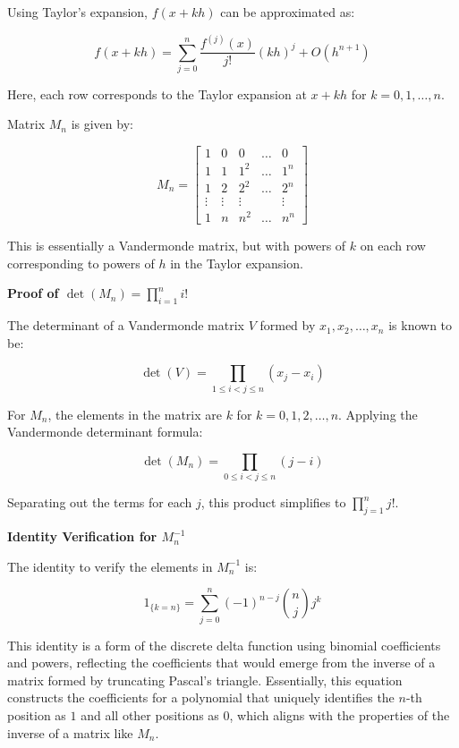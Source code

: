 \documentclass[8pt]{article}
\begin{document}
Using Taylor's expansion, \( f(x + kh) \) can be approximated as:

\[
f(x + kh) = \sum_{j=0}^n \frac{f^{(j)}(x)}{j!} (kh)^j + O(h^{n+1})
\]

Here, each row corresponds to the Taylor expansion at \( x + kh \) for \( k = 0, 1, \ldots, n \).

Matrix \( M_n \) is given by:

\[
M_n = \begin{bmatrix}
1 & 0 & 0 & \dots & 0 \\
1 & 1 & 1^2 & \dots & 1^n \\
1 & 2 & 2^2 & \dots & 2^n \\
\vdots & \vdots & \vdots & & \vdots \\
1 & n & n^2 & \dots & n^n
\end{bmatrix}
\]

This is essentially a Vandermonde matrix, but with powers of \( k \) on each row corresponding to powers of \( h \) in the Taylor expansion.

\textbf{Proof of \( \det(M_n) = \prod_{i=1}^n i! \)}

The determinant of a Vandermonde matrix \( V \) formed by \( x_1, x_2, \ldots, x_n \) is known to be:

\[
\det(V) = \prod_{1 \leq i < j \leq n} (x_j - x_i)
\]

For \( M_n \), the elements in the matrix are \( k \) for \( k = 0, 1, 2, \ldots, n \). Applying the Vandermonde determinant formula:

\[
\det(M_n) = \prod_{0 \leq i < j \leq n} (j - i)
\]

Separating out the terms for each \( j \), this product simplifies to \( \prod_{j=1}^n j! \).

\textbf{Identity Verification for \( M_n^{-1} \)}

The identity to verify the elements in \( M_n^{-1} \) is:

\[
1_{\{k=n\}} = \sum_{j=0}^n (-1)^{n-j} \binom{n}{j} j^k
\]

This identity is a form of the discrete delta function using binomial coefficients and powers, reflecting the coefficients that would emerge from the inverse of a matrix formed by truncating Pascal’s triangle. Essentially, this equation constructs the coefficients for a polynomial that uniquely identifies the \( n \)-th position as \( 1 \) and all other positions as \( 0 \), which aligns with the properties of the inverse of a matrix like \( M_n \).
\end{document}
